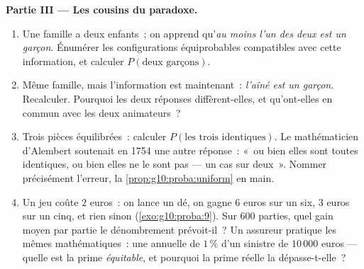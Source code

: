 \begin{problem}
\medskip
\noindent\textbf{Partie III --- Les cousins du paradoxe.}
\begin{enumerate}[resume]
  \item Une famille a deux enfants~; on apprend qu'\emph{au moins
        l'un des deux est un garçon}. Énumérer les configurations
        équiprobables compatibles avec cette information, et
        calculer $P(\text{deux garçons})$.
  \item Même famille, mais l'information est maintenant~:
        \emph{l'aîné est un garçon}. Recalculer. Pourquoi les deux
        réponses diffèrent-elles, et qu'ont-elles en commun avec les
        deux animateurs~?
  \item Trois pièces équilibrées~: calculer
        $P(\text{les trois identiques})$. Le mathématicien
        d'Alembert soutenait en 1754 une autre réponse~: «~ou bien
        elles sont toutes identiques, ou bien elles ne le sont pas
        --- un cas sur deux~». Nommer précisément l'erreur, la
        \cref{prop:g10:proba:uniform} en main.
  \item Un jeu coûte $2$ euros~: on lance un dé, on gagne $6$ euros
        sur un six, $3$ euros sur un cinq, et rien sinon
        (\cref{exo:g10:proba:9}). Sur $600$ parties, quel gain
        moyen par partie le dénombrement prévoit-il~? Un assureur
        pratique les mêmes mathématiques~: une  annuelle
        de $1\,\%$ d'un sinistre de $10\,000$ euros --- quelle est
        la prime \emph{équitable}, et pourquoi la prime réelle la
        dépasse-t-elle~?
\end{enumerate}


\end{problem}
